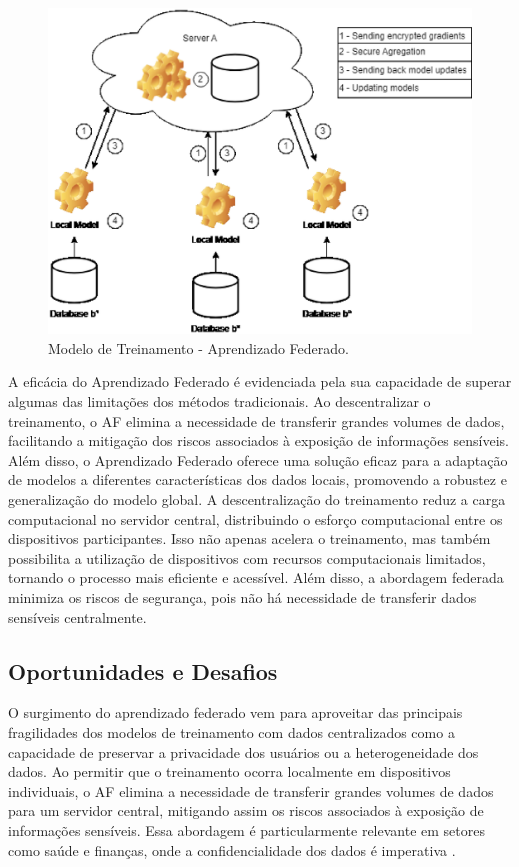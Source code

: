 \begin{figure}[ht]
    \centering
    \includegraphics[scale=0.50]{figuras/teorica/federatedDiagram.eps}
    \caption{Modelo de Treinamento - Aprendizado Federado.}
    \label{fig:FederatedLearning}
\end{figure}

A eficácia do Aprendizado Federado é evidenciada pela sua capacidade de superar algumas das limitações dos métodos tradicionais. Ao descentralizar o treinamento, o AF elimina a necessidade de transferir grandes volumes de dados, facilitando a mitigação dos riscos associados à exposição de informações sensíveis. Além disso, o Aprendizado Federado oferece uma solução eficaz para a adaptação de modelos a diferentes características dos dados locais, promovendo a robustez e generalização do modelo global. A descentralização do treinamento reduz a carga computacional no servidor central, distribuindo o esforço computacional entre os dispositivos participantes\cite{yang2019federated}. Isso não apenas acelera o treinamento, mas também possibilita a utilização de dispositivos com recursos computacionais limitados, tornando o processo mais eficiente e acessível. Além disso, a abordagem federada minimiza os riscos de segurança, pois não há necessidade de transferir dados sensíveis centralmente\cite{bonawitz2019towards}.

\subsection{Oportunidades e Desafios}

O surgimento do aprendizado federado vem para aproveitar das principais fragilidades dos modelos de treinamento com dados centralizados como a capacidade de preservar a privacidade dos usuários ou a heterogeneidade dos dados. Ao permitir que o treinamento ocorra localmente em dispositivos individuais, o AF elimina a necessidade de transferir grandes volumes de dados para um servidor central, mitigando assim os riscos associados à exposição de informações sensíveis. Essa abordagem é particularmente relevante em setores como saúde e finanças, onde a confidencialidade dos dados é imperativa \cite{mcmahan2017communication}.


